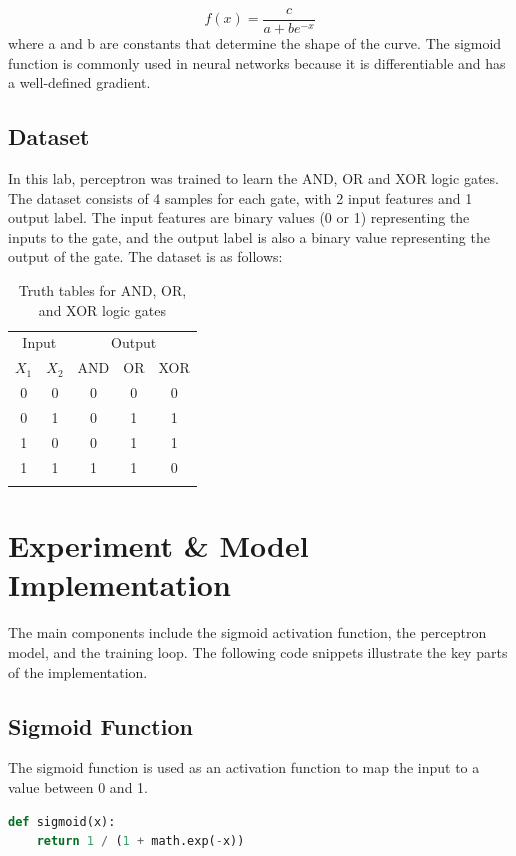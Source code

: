 \documentclass[a4paper, journal]{IEEEtran}
\begin{document}
\begin{equation}
    f(x) = \frac{c}{a + be^{-x}}
\end{equation}
where a and b are constants that determine the shape of the curve. The sigmoid function is commonly used in neural networks because it is differentiable and has a well-defined gradient.

\subsection*{Dataset}
In this lab, perceptron was trained to learn the AND, OR and XOR logic gates. The dataset consists of 4 samples for each gate, with 2 input features and 1 output label. The input features are binary values (0 or 1) representing the inputs to the gate, and the output label is also a binary value representing the output of the gate.
The dataset is as follows:
\begin{table}[ht]
    \centering
    \begin{tabular}{cc|ccc}
        \toprule
        \multicolumn{2}{c|}{Input} & \multicolumn{3}{c}{Output} \\
        $X_1$ & $X_2$ & AND & OR & XOR \\
        \midrule
        0 & 0 & 0 & 0 & 0 \\
        0 & 1 & 0 & 1 & 1 \\
        1 & 0 & 0 & 1 & 1 \\
        1 & 1 & 1 & 1 & 0 \\
        \bottomrule
        \vspace{1mm}
    \end{tabular}
    \caption{Truth tables for AND, OR, and XOR logic gates}
    \label{tab:logic_gates}
\end{table}
\section{Experiment \& Model Implementation}
The main components include the sigmoid activation function, the perceptron model, and the training loop. The following code snippets illustrate the key parts of the implementation.

\subsection{Sigmoid Function}
The sigmoid function is used as an activation function to map the input to a value between 0 and 1.
\begin{lstlisting}[language=Python, caption=Sigmoid Function]
def sigmoid(x):
    return 1 / (1 + math.exp(-x))
\end{lstlisting}
\end{document}
